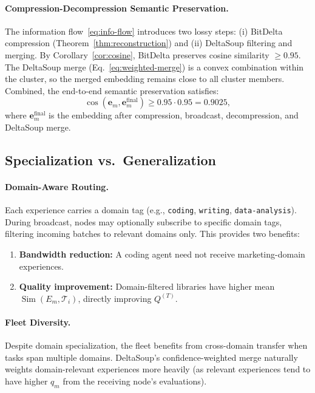 \documentclass[11pt]{article}
\DeclareMathOperator{\Sim}{Sim}
\begin{document}
\paragraph{Compression-Decompression Semantic Preservation.}
The information flow~\eqref{eq:info-flow} introduces two lossy steps:
(i) BitDelta compression (Theorem~\ref{thm:reconstruction}) and
(ii) DeltaSoup filtering and merging. By Corollary~\ref{cor:cosine},
BitDelta preserves cosine similarity $\geq 0.95$. The DeltaSoup merge
(Eq.~\ref{eq:weighted-merge}) is a convex combination within the cluster,
so the merged embedding remains close to all cluster members. Combined,
the end-to-end semantic preservation satisfies:
\begin{equation}
    \cos(\bm{e}_m, \bm{e}_m^{\text{final}}) \geq 0.95 \cdot 0.95 = 0.9025,
    \label{eq:end-to-end-cosine}
\end{equation}
where $\bm{e}_m^{\text{final}}$ is the embedding after compression,
broadcast, decompression, and DeltaSoup merge.

\subsection{Specialization vs.\ Generalization}

\paragraph{Domain-Aware Routing.}
Each experience carries a domain tag (e.g., \texttt{coding}, \texttt{writing},
\texttt{data-analysis}). During broadcast, nodes may optionally subscribe to
specific domain tags, filtering incoming batches to relevant domains only.
This provides two benefits:
\begin{enumerate}[leftmargin=1.5em]
    \item \textbf{Bandwidth reduction:} A coding agent need not receive
          marketing-domain experiences.
    \item \textbf{Quality improvement:} Domain-filtered libraries have higher
          mean $\Sim(E_m, \mathcal{T}_i)$, directly improving $Q^{(T)}$.
\end{enumerate}

\paragraph{Fleet Diversity.}
Despite domain specialization, the fleet benefits from cross-domain transfer
when tasks span multiple domains. DeltaSoup's confidence-weighted merge
naturally weights domain-relevant experiences more heavily (as relevant
experiences tend to have higher $q_m$ from the receiving node's evaluations).
\end{document}
